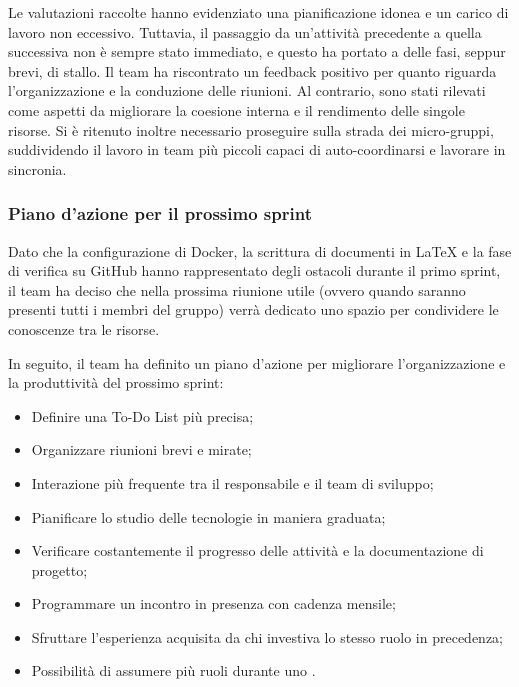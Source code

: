 \vspace{0.5\baselineskip}
\par Le valutazioni raccolte hanno evidenziato una pianificazione idonea e un carico di lavoro non eccessivo. Tuttavia, il passaggio da un'attività precedente a quella successiva non è sempre stato immediato, e questo ha portato a delle fasi, seppur brevi, di stallo. Il team ha riscontrato un feedback positivo per quanto riguarda l'organizzazione e la conduzione delle riunioni. Al contrario, sono stati rilevati come aspetti da migliorare la coesione interna e il rendimento delle singole risorse. Si è ritenuto inoltre necessario proseguire sulla strada dei micro-gruppi, suddividendo il lavoro in team più piccoli capaci di auto-coordinarsi e lavorare in sincronia.

\subsubsection{Piano d'azione per il prossimo sprint}
\par Dato che la configurazione di Docker, la scrittura di documenti in LaTeX e la fase di verifica su GitHub hanno rappresentato degli ostacoli durante il primo sprint, il team ha deciso che nella prossima riunione utile (ovvero quando saranno presenti tutti i membri del gruppo) verrà dedicato uno spazio per condividere le conoscenze tra le risorse.
\par In seguito, il team ha definito un piano d'azione per migliorare l'organizzazione e la produttività del prossimo sprint:
\begin{itemize}
  \item Definire una To-Do List più precisa;
  \item Organizzare riunioni brevi e mirate;
  \item Interazione più frequente tra il responsabile e il team di sviluppo;
  \item Pianificare lo studio delle tecnologie in maniera graduata;
  \item Verificare costantemente il progresso delle attività e la documentazione di progetto;
  \item Programmare un incontro in presenza con cadenza mensile;
  \item Sfruttare l'esperienza acquisita da chi investiva lo stesso ruolo in precedenza;
  \item Possibilità di assumere più ruoli durante uno .
\end{itemize}


